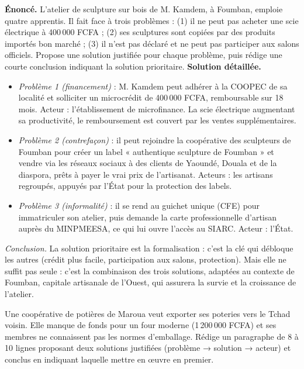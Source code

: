 \documentclass[11pt]{article}
\begin{document}
\begin{exoresolu}
\textbf{Énoncé.} L'atelier de sculpture sur bois de M. Kamdem, à Foumban, emploie quatre apprentis. Il fait face à trois problèmes : (1) il ne peut pas acheter une scie électrique à 400\,000 FCFA ; (2) ses sculptures sont copiées par des produits importés bon marché ; (3) il n'est pas déclaré et ne peut pas participer aux salons officiels. Propose une solution justifiée pour chaque problème, puis rédige une courte conclusion indiquant la solution prioritaire.
\tcblower
\textbf{Solution détaillée.}
\begin{itemize}
\item \emph{Problème 1 (financement)} : M. Kamdem peut adhérer à la COOPEC de sa localité et solliciter un microcrédit de 400\,000 FCFA, remboursable sur 18 mois. Acteur : l'établissement de microfinance. La scie électrique augmentant sa productivité, le remboursement est couvert par les ventes supplémentaires.
\item \emph{Problème 2 (contrefaçon)} : il peut rejoindre la coopérative des sculpteurs de Foumban pour créer un label « authentique sculpture de Foumban » et vendre via les réseaux sociaux à des clients de Yaoundé, Douala et de la diaspora, prêts à payer le vrai prix de l'artisanat. Acteurs : les artisans regroupés, appuyés par l'État pour la protection des labels.
\item \emph{Problème 3 (informalité)} : il se rend au guichet unique (CFE) pour immatriculer son atelier, puis demande la carte professionnelle d'artisan auprès du MINPMEESA, ce qui lui ouvre l'accès au SIARC. Acteur : l'État.
\end{itemize}
\emph{Conclusion.} La solution prioritaire est la formalisation : c'est la clé qui débloque les autres (crédit plus facile, participation aux salons, protection). Mais elle ne suffit pas seule : c'est la combinaison des trois solutions, adaptées au contexte de Foumban, capitale artisanale de l'Ouest, qui assurera la survie et la croissance de l'atelier.
\end{exoresolu}

\begin{exercice}
Une coopérative de potières de Maroua veut exporter ses poteries vers le Tchad voisin. Elle manque de fonds pour un four moderne (1\,200\,000 FCFA) et ses membres ne connaissent pas les normes d'emballage. Rédige un paragraphe de 8 à 10 lignes proposant deux solutions justifiées (problème → solution → acteur) et conclus en indiquant laquelle mettre en œuvre en premier.
\end{exercice}
\end{document}
